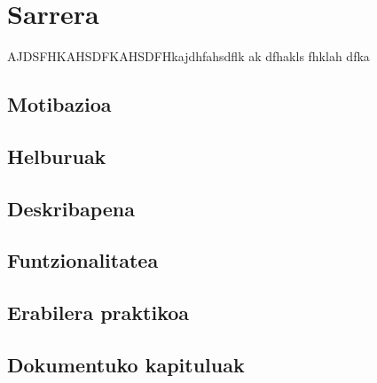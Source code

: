 \chapter{Sarrera}
\vspace{3cm}
AJDSFHKAHSDFKAHSDFHkajdhfahsdflk ak dfhakls fhklah dfka
\newpage
\section{Motibazioa}
\section{Helburuak}
\section{Deskribapena}
\section{Funtzionalitatea}
\section{Erabilera praktikoa}
\section{Dokumentuko kapituluak}